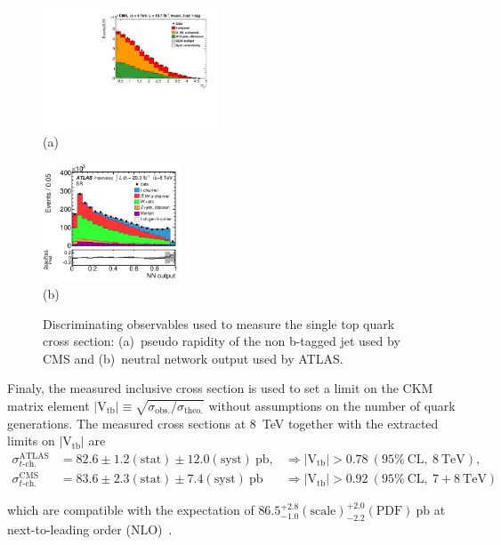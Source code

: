 \documentclass{PoS}
\begin{document}
\begin{figure}[htbp]
\begin{center}
\parbox[t]{0.5\textwidth}{\centering\includegraphics[width=0.46\textwidth]{cms_xsec8/etamuon.pdf}\\(a)}
\parbox[t]{0.42\textwidth}{\centering\includegraphics[width=0.37\textwidth]{atlas_xsec8/nnoutput.pdf}\\(b)}

\end{center}
\caption{\label{fig:fit-xsec-8}Discriminating observables used to measure the single top quark cross section: (a)~pseudo rapidity of the non b-tagged jet used by CMS and (b)~neutral network output used by ATLAS.}

\end{figure}

Finaly, the measured inclusive cross section is used to set a limit on the CKM matrix element $|\mathrm{V_{tb}}|\equiv\sqrt{\sigma_\mathrm{obs.}/\sigma_\mathrm{theo.}}$ without assumptions on the number of quark generations. The measured cross sections at 8~TeV together with the extracted limits on $\mathrm{|V_{tb}|}$ are 
\begin{align}
\sigma_{t\mbox{-}\mathrm{ch.}}^\mathrm{ATLAS}&=82.6\pm1.2\mathrm{(stat)}\pm12.0\mathrm{(syst)}~\mathrm{pb}, &\Rightarrow |\mathrm{V_{tb}}|>0.78~\mathrm{(95\%~CL,~8~TeV)}, \\
\sigma_{t\mbox{-}\mathrm{ch.}}^\mathrm{CMS}&=83.6\pm2.3\mathrm{(stat)}\pm7.4\mathrm{(syst)}~\mathrm{pb} &\Rightarrow |\mathrm{V_{tb}}|>0.92~\mathrm{(95\%~CL,~7+8~TeV)}
\end{align}

which are compatible with the expectation of $86.5_{-1.0}^{+2.8}\mathrm{(scale)}_{-2.2}^{+2.0}\mathrm{(PDF)}~\mathrm{pb}$ at next-to-leading order (NLO)~\cite{Kidonakis-8tev}.
\end{document}
